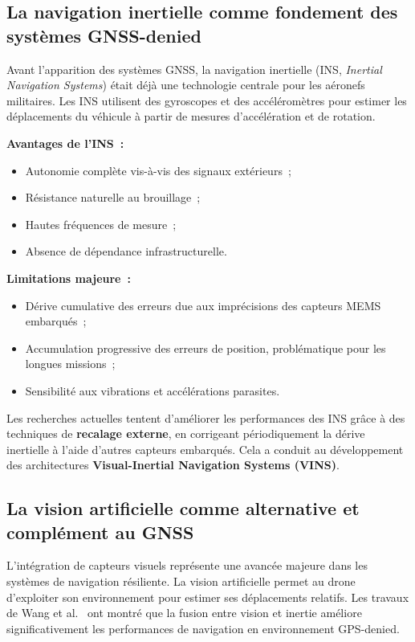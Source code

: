\documentclass[12pt, a4paper, twoside, openright]{report}
\begin{document}
\subsection{La navigation inertielle comme fondement des systèmes GNSS-denied}

Avant l'apparition des systèmes GNSS, la navigation inertielle (INS, \textit{Inertial Navigation Systems}) était déjà une technologie centrale pour les aéronefs militaires. Les INS utilisent des gyroscopes et des accéléromètres pour estimer les déplacements du véhicule à partir de mesures d'accélération et de rotation.

\textbf{Avantages de l'INS~:}
\begin{itemize}
    \item Autonomie complète vis-à-vis des signaux extérieurs~;
    \item Résistance naturelle au brouillage~;
    \item Hautes fréquences de mesure~;
    \item Absence de dépendance infrastructurelle.
\end{itemize}

\textbf{Limitations majeure~:}
\begin{itemize}
    \item Dérive cumulative des erreurs due aux imprécisions des capteurs MEMS embarqués~;
    \item Accumulation progressive des erreurs de position, problématique pour les longues missions~;
    \item Sensibilité aux vibrations et accélérations parasites.
\end{itemize}

Les recherches actuelles tentent d'améliorer les performances des INS grâce à des techniques de \textbf{recalage externe}, en corrigeant périodiquement la dérive inertielle à l'aide d'autres capteurs embarqués. Cela a conduit au développement des architectures \textbf{Visual-Inertial Navigation Systems (VINS)}.

\subsection{La vision artificielle comme alternative et complément au GNSS}

L'intégration de capteurs visuels représente une avancée majeure dans les systèmes de navigation résiliente. La vision artificielle permet au drone d'exploiter son environnement pour estimer ses déplacements relatifs. Les travaux de Wang et al.~\cite{wang2013visual} ont montré que la fusion entre vision et inertie améliore significativement les performances de navigation en environnement GPS-denied.
\end{document}
